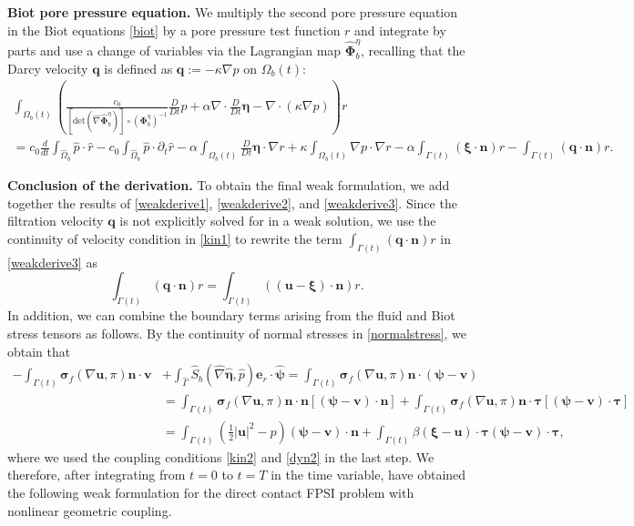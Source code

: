 \documentclass[11pt]{article}
\newcommand{\bd}{\boldsymbol}
\theoremstyle{definition}
\begin{document}
\medskip

\noindent \textbf{Biot pore pressure equation.} We multiply the second pore pressure equation in the Biot equations \eqref{biot} by a pore pressure test function $r$ and integrate by parts and use a change of variables via the Lagrangian map $\hat{\bd{\Phi}}^{\eta}_{b}$, recalling that the Darcy velocity $\bd{q}$ is defined as $\bd{q} := -\kappa \nabla p$ on $\Omega_{b}(t)$:
\begin{multline}\label{weakderive3}
\int_{\Omega_{b}(t)} \left(\frac{c_{0}}{[\text{det}(\hat{\nabla}\hat{\bd{\Phi}}^{\eta}_{b})] \circ (\bd{\Phi}^{\eta}_{b})^{-1}} \frac{D}{Dt} p + \alpha \nabla \cdot \frac{D}{Dt} \bd{\eta} - \nabla \cdot (\kappa \nabla p) \right) r \\
= c_{0} \frac{d}{dt} \int_{\hat{\Omega}_{b}} \hat{p} \cdot \hat{r} - c_{0} \int_{\hat{\Omega}_{b}} \hat{p} \cdot \partial_{t}\hat{r} - \alpha \int_{\Omega_{b}(t)} \frac{D}{Dt} \bd{\eta} \cdot \nabla r + \kappa \int_{\Omega_{b}(t)} \nabla p \cdot \nabla r - \alpha \int_{\Gamma(t)} (\bd{\xi} \cdot \bd{n}) r - \int_{\Gamma(t)} (\bd{q} \cdot \bd{n}) r. 
\end{multline}

\medskip

\noindent \textbf{Conclusion of the derivation.} To obtain the final weak formulation, we add together the results of \eqref{weakderive1}, \eqref{weakderive2}, and \eqref{weakderive3}. Since the filtration velocity $\bd{q}$ is not explicitly solved for in a weak solution, we use the continuity of velocity condition in \eqref{kin1} to rewrite the term $\displaystyle \int_{\Gamma(t)} (\bd{q} \cdot \bd{n}) r$ in \eqref{weakderive3} as
\begin{equation*}
\int_{\Gamma(t)} (\bd{q} \cdot \bd{n}) r = \int_{\Gamma(t)} ((\bd{u} - \bd{\xi}) \cdot \bd{n}) r.
\end{equation*}
In addition, we can combine the boundary terms arising from the fluid and Biot stress tensors as follows. By the continuity of normal stresses in \eqref{normalstress}, we obtain that
\begin{align*}
-\int_{\Gamma(t)} \bd{\sigma}_{f}(\nabla \bd{u}, \pi) \bd{n} \cdot \bd{v} &+ \int_{\hat{\Gamma}} \hat{S}_{b}(\hat{\nabla} \hat{\bd{\eta}}, \hat{p}) \bd{e}_{r} \cdot \hat{\bd{\psi}} = \int_{\Gamma(t)} \bd{\sigma}_{f}(\nabla \bd{u}, \pi) \bd{n} \cdot (\bd{\psi} - \bd{v}) \\
&= \int_{\Gamma(t)} \bd{\sigma}_{f}(\nabla \bd{u}, \pi) \bd{n} \cdot \bd{n} [(\bd{\psi} - \bd{v}) \cdot \bd{n}] + \int_{\Gamma(t)} \bd{\sigma}_{f}(\nabla \bd{u}, \pi) \bd{n} \cdot \bd{\tau} [(\bd{\psi} - \bd{v}) \cdot \bd{\tau}] \\
&= \int_{\Gamma(t)} \left(\frac{1}{2} |\bd{u}|^{2} - p\right) (\bd{\psi} - \bd{v}) \cdot \bd{n} + \int_{\Gamma(t)} \beta (\bd{\xi} - \bd{u}) \cdot \bd{\tau} (\bd{\psi} - \bd{v}) \cdot \bd{\tau},
\end{align*}
where we used the coupling conditions \eqref{kin2} and \eqref{dyn2} in the last step. We therefore, after integrating from $t = 0$ to $t = T$ in the time variable, have obtained the following weak formulation for the direct contact FPSI problem with nonlinear geometric coupling.
\end{document}
